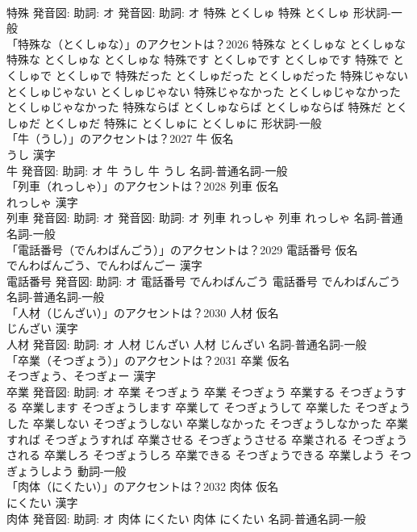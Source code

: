 \documentclass[8pt]{extreport}
\begin{document}
\begin{CJK}{UTF8}{min}
\\	特殊 発音図: 助詞: オ 発音図: 助詞: オ	特殊 とくしゅ		特殊 とくしゅ				形状詞-一般 
\\	「特殊な（とくしゅな）」のアクセントは？2026		特殊な とくしゅな とくしゅな		特殊な とくしゅな とくしゅな 特殊です とくしゅです とくしゅです 特殊で とくしゅで とくしゅで 特殊だった とくしゅだった とくしゅだった 特殊じゃない とくしゅじゃない とくしゅじゃない 特殊じゃなかった とくしゅじゃなかった とくしゅじゃなかった 特殊ならば とくしゅならば とくしゅならば 特殊だ とくしゅだ とくしゅだ 特殊に とくしゅに とくしゅに				形状詞-一般 
\\	「牛（うし）」のアクセントは？2027	牛 仮名　
\\	うし 漢字　
\\	牛 発音図: 助詞: オ	牛 うし		牛 うし				名詞-普通名詞-一般 
\\	「列車（れっしゃ）」のアクセントは？2028	列車 仮名　
\\	れっしゃ 漢字　
\\	列車 発音図: 助詞: オ 発音図: 助詞: オ	列車 れっしゃ		列車 れっしゃ				名詞-普通名詞-一般 
\\	「電話番号（でんわばんごう）」のアクセントは？2029	電話番号 仮名　
\\	でんわばんごう、でんわばんごー 漢字　
\\	電話番号 発音図: 助詞: オ	電話番号 でんわばんごう		電話番号 でんわばんごう				名詞-普通名詞-一般 
\\	「人材（じんざい）」のアクセントは？2030	人材 仮名　
\\	じんざい 漢字　
\\	人材 発音図: 助詞: オ	人材 じんざい		人材 じんざい				名詞-普通名詞-一般 
\\	「卒業（そつぎょう）」のアクセントは？2031	卒業 仮名　
\\	そつぎょう、そつぎょー 漢字　
\\	卒業 発音図: 助詞: オ	卒業 そつぎょう		卒業 そつぎょう 卒業する そつぎょうする 卒業します そつぎょうします 卒業して そつぎょうして 卒業した そつぎょうした 卒業しない そつぎょうしない 卒業しなかった そつぎょうしなかった 卒業すれば そつぎょうすれば 卒業させる そつぎょうさせる 卒業される そつぎょうされる 卒業しろ そつぎょうしろ 卒業できる そつぎょうできる 卒業しよう そつぎょうしよう				動詞-一般 
\\	「肉体（にくたい）」のアクセントは？2032	肉体 仮名　
\\	にくたい 漢字　
\\	肉体 発音図: 助詞: オ	肉体 にくたい		肉体 にくたい				名詞-普通名詞-一般 

\end{CJK}
\end{document}
